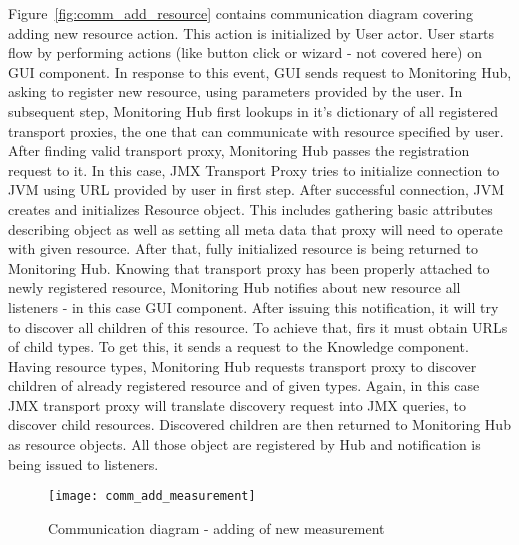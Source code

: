 Figure~\ref{fig:comm_add_resource} contains communication diagram covering adding new resource action. This action is
initialized by User actor. User starts flow by performing actions (like button click or wizard - not covered here) on
GUI component. In response to this event, GUI sends request to Monitoring Hub, asking to register new resource,
using parameters provided by the user. In subsequent step, Monitoring Hub first lookups in it's dictionary of all
registered transport proxies, the one that can communicate with resource specified by user. After finding valid
transport proxy, Monitoring Hub passes the registration request to it. In this case, JMX
Transport Proxy tries to initialize connection to JVM using URL provided by user in first step. After successful
connection, JVM creates and initializes Resource object. This includes gathering basic attributes describing object
as well as setting all meta data that proxy will need to operate with given resource. After that, fully initialized
resource is being returned to Monitoring Hub. Knowing that transport proxy has been properly attached to newly
registered resource, Monitoring Hub notifies about new resource all listeners - in this case GUI component. After
issuing this notification, it will try to discover all children of this resource. To achieve that, firs it must
obtain URLs of child types. To get this, it sends a request to the Knowledge component.
Having resource types, Monitoring Hub requests transport proxy to discover children of already registered resource and
of given types. Again, in this case JMX transport proxy will translate discovery request into JMX queries, to discover
child resources. Discovered children are then returned to Monitoring Hub as resource objects. All those object are
registered by Hub and notification is being issued to listeners.


\begin{figure}[ht]
  \centering
  \texttt{[image: comm\_add\_measurement]}
  \caption{Communication diagram - adding of new measurement}
  \label{fig:comm_add_measurement}
\end{figure}

